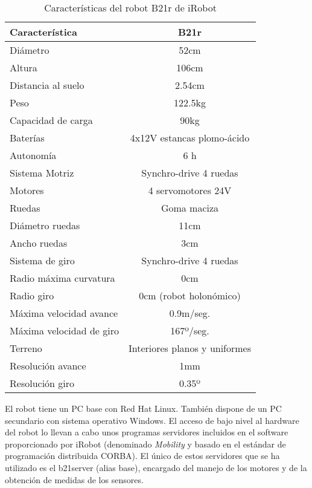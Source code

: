 \begin{table}[h]
\begin{center}
\caption{Características del robot B21r de iRobot}\label{tb:b21r}

\vspace{5mm}

\begin{tabular}{|l|c|} \hline
Característica & B21r\\ \hline\hline
Diámetro & 52cm\\ \hline
Altura & 106cm\\ \hline
Distancia al suelo & 2.54cm\\ \hline
Peso & 122.5kg\\ \hline
Capacidad de carga & 90kg\\ \hline
Baterías & 4x12V estancas plomo-ácido\\ \hline\hline
Autonomía & 6 h\\ \hline
Sistema Motriz & Synchro-drive 4 ruedas\\\hline
Motores & 4 servomotores 24V\\ \hline
Ruedas & Goma maciza\\ \hline\hline
Diámetro ruedas & 11cm\\ \hline
Ancho ruedas & 3cm\\ \hline
Sistema de giro & Synchro-drive 4 ruedas\\ \hline
Radio máxima curvatura & 0cm\\ \hline
Radio giro & 0cm (robot holonómico)\\ \hline\hline
Máxima velocidad avance & 0.9m/seg.\\ \hline
Máxima velocidad de giro & 167º/seg.\\ \hline
Terreno & Interiores planos y uniformes\\ \hline
Resolución avance & 1mm\\ \hline
Resolución giro & 0.35º\\ \hline
\end{tabular}
\end{center}
\end{table}

El robot tiene un PC base con Red Hat Linux. También dispone de un PC secundario con sistema operativo Windows. El acceso de bajo nivel al hardware del robot lo llevan a cabo unos programas servidores incluidos en el software proporcionado por iRobot (denominado \emph{Mobility} y basado en el estándar de programación distribuida CORBA). El único de estos servidores que se ha utilizado es el b21server (alias base), encargado del manejo de los motores y de la obtención de medidas de los sensores.

